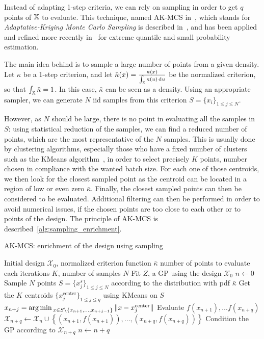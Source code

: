 \documentclass[../../Main_ManuscritThese.tex]{subfiles}
\begin{document}
Instead of adapting 1-step criteria, we can rely on sampling in order to get $q$ points of $\mathbb{X}$ to evaluate.
This technique, named AK-MCS in~\cite{echard_ak-mcs_2011}, which stands for \emph{Adaptative-Kriging Monte Carlo Sampling} is described in~\cite{dubourg_reliability-based_2011}, and has been applied and refined more recently in~\cite{schobi_rare_2017,razaaly_quantile-based_2020,razaaly_rare_2019} for extreme quantile and small probability estimation.

The main idea behind  is to sample a large number of points from a given density.
Let $\kappa$ be a 1-step criterion, and let $\bar{\kappa}(x) = \frac{\kappa(x)}{\int_{\mathbb{X}}\kappa(u)\,\mathrm{d}u}$ be the normalized criterion, so that $\int_{\mathbb{X}} \bar{\kappa}=1$. In this case, $\bar{\kappa}$ can be seen as a density.  Using an appropriate sampler, we can generate $N$ iid samples from this criterion $S=\{x_i\}_{1\leq j \leq N}$. 
  
However, as $N$ should be large, there is no point in evaluating all the samples in $S$: using statistical reduction of the samples, we can find a reduced number of points, which are the most representative of the $N$ samples. This is usually done by clustering algorithms, especially those who have a fixed number of clusters such as the KMeans algorithm~\cite{macqueen_methods_1967}, in order to select precisely $K$ points, number chosen in compliance with the wanted batch size. For each one of those centroids, we then look for the closest sampled point as the centroid can be located in a region of low or even zero $\bar{\kappa}$.
Finally, the closest sampled points can then be considered to be evaluated.
Additional filtering can then be performed in order to avoid numerical issues, if the chosen points are too close to each other or to points of the design.
The principle of AK-MCS is described~\cref{alg:sampling_enrichment}.

\begin{algorithm}
\caption{AK-MCS: enrichment of the design using sampling}
\label{alg:sampling_enrichment}
\begin{algorithmic}
  \REQUIRE Initial design $\mathcal{X}_0$, normalized criterion function $\bar{\kappa}$
  \REQUIRE number of points to evaluate each iterations $K$, number of samples $N$
\STATE Fit $Z$, a GP using the design $\mathcal{X}_0$
\STATE $n \leftarrow 0$
\STATE Sample $N$ points $S = \{x^s_j\}_{1 \leq j \leq N}$ according to the distribution with pdf $\bar{\kappa}$
\STATE Get the $K$ centroids $\{x_j^{\mathrm{center}}\}_{1 \leq j \leq q}$ using KMeans on $S$
\STATE $x_{n+j}=\operatorname*{arg\,min \,}_{x \in S \setminus \{x_{n+1}, \dots, x_{n+j-1}\}} \|x - x_j^{\mathrm{center}} \|$
\ENDFOR
\STATE Evaluate $f(x_{n+1}),\dots f(x_{n+q})$
\STATE $\mathcal{X}_{n+q} \leftarrow \mathcal{X}_n \cup \left\{\left(x_{n+1}, f(x_{n+1})\right),\dots,  \left(x_{n+q}, f(x_{n+q})\right)\right\}$
\STATE Condition the GP according to $\mathcal{X}_{n+q}$
\STATE $n \leftarrow n + q$
\ENDWHILE
\end{algorithmic}
\end{algorithm}
\end{document}
